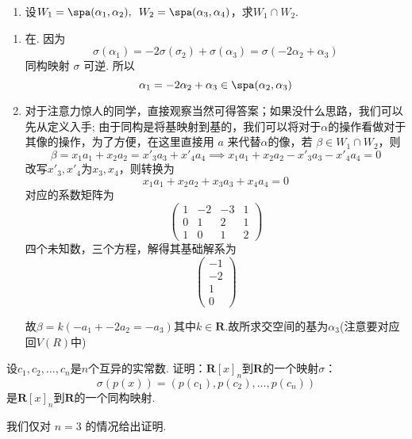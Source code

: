 \begin{exercise}
\begin{exgroup}
\begin{enumerate}
            \item 设$W_1=\spa(\alpha_1,\alpha_2),\enspace W_2=\spa(\alpha_3,\alpha_4)$，求$W_1\cap W_2$.
        \end{enumerate}

        \begin{answer}
            \begin{enumerate}
                \item 在. 因为
                      \[ \sigma(\alpha_1) = -2 \sigma(\sigma_2) + \sigma(\alpha_3) = \sigma(-2 \alpha_2 + \alpha_3) \]
                      同构映射 $ \sigma $ 可逆. 所以
                      \[ \alpha_1 = -2 \alpha_2 + \alpha_3 \in \spa(\alpha_2, \alpha_3) \]
                \item 对于注意力惊人的同学，直接观察当然可得答案；如果没什么思路，我们可以先从定义入手;
                由于同构是将基映射到基的，我们可以将对于$\alpha$的操作看做对于其像的操作，为了方便，在这里直接用 $a$ 来代替$\alpha$的像，若 $\beta \in W_1\cap W_2$，则
                \[ \beta = x_1 a_1+x_2 a_2=x'_3 a_3+x'_4 a_4 \implies  x_1 a_1+x_2 a_2-x'_3 a_3-x'_4 a_4 = 0 \]
                改写$x'_3,x'_4$为$x_3,x_4$，则转换为
                \[ x_1 a_1+x_2 a_2+x_3 a_3+x_4 a_4 = 0 \]
                对应的系数矩阵为
                \[ \begin{pmatrix}
                    1 & -2 & -3 & 1 \\
                    0 & 1 & 2 & 1\\
                    1 & 0 & 1 & 2
                \end{pmatrix} \]
                四个未知数，三个方程，解得其基础解系为
                \[ \begin{pmatrix}
                    -1 \\
                    -2 \\
                    1 \\
                    0
                \end{pmatrix} \]

                故$\beta = k(-a_1+-2a_2=-a_3)$其中$k\in \mathbf{R}$.故所求交空间的基为$\alpha_3$(注意要对应回$V(R)$中)
            \end{enumerate}
        \end{answer}

        \item 设$c_1,c_2,\ldots,c_n$是$n$个互异的实常数. 证明：$\mathbf{R}[x]_n$到$\mathbf{R}$的一个映射$\sigma$：
        \[\sigma(p(x))=(p(c_1),p(c_2),\ldots,p(c_n))\]
        是$\mathbf{R}[x]_n$到$\mathbf{R}$的一个同构映射.
        \begin{answer}
            我们仅对 $ n = 3 $ 的情况给出证明. %


\end{answer}
\end{exgroup}
\end{exercise}
